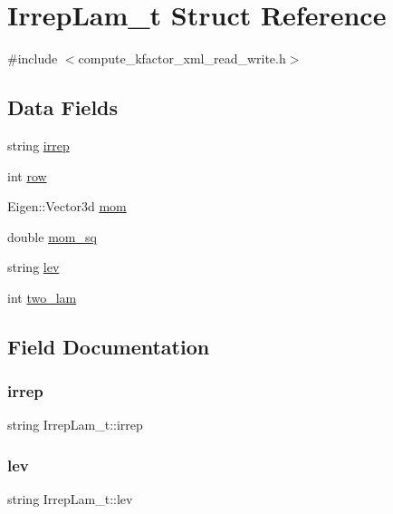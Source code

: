 \hypertarget{structIrrepLam__t}{}\section{Irrep\+Lam\+\_\+t Struct Reference}
\label{structIrrepLam__t}


{\ttfamily \#include $<$compute\+\_\+kfactor\+\_\+xml\+\_\+read\+\_\+write.\+h$>$}

\subsection*{Data Fields}
\begin{DoxyCompactItemize}
\item 
string \mbox{\hyperlink{structIrrepLam__t_ac92465673b27186aac1d8116431317e8}{irrep}}
\item 
int \mbox{\hyperlink{structIrrepLam__t_aafc6b933bfa5353ed9c03779adf76ef3}{row}}
\item 
Eigen\+::\+Vector3d \mbox{\hyperlink{structIrrepLam__t_a610bf0af8508ab920d61589c1f748208}{mom}}
\item 
double \mbox{\hyperlink{structIrrepLam__t_aa9a57838bc1de3a127eaaed2643362d1}{mom\+\_\+sq}}
\item 
string \mbox{\hyperlink{structIrrepLam__t_a14c8680b3bf7141c783a70444c4c3f87}{lev}}
\item 
int \mbox{\hyperlink{structIrrepLam__t_abc021a51cfaa53aaa86e51938fad1189}{two\+\_\+lam}}
\end{DoxyCompactItemize}


\subsection{Field Documentation}
\mbox{\label{structIrrepLam__t_ac92465673b27186aac1d8116431317e8}} 
\subsubsection{\texorpdfstring{irrep}{irrep}}
{\footnotesize\ttfamily string Irrep\+Lam\+\_\+t\+::irrep}

\mbox{\label{structIrrepLam__t_a14c8680b3bf7141c783a70444c4c3f87}} 
\subsubsection{\texorpdfstring{lev}{lev}}
{\footnotesize\ttfamily string Irrep\+Lam\+\_\+t\+::lev}

